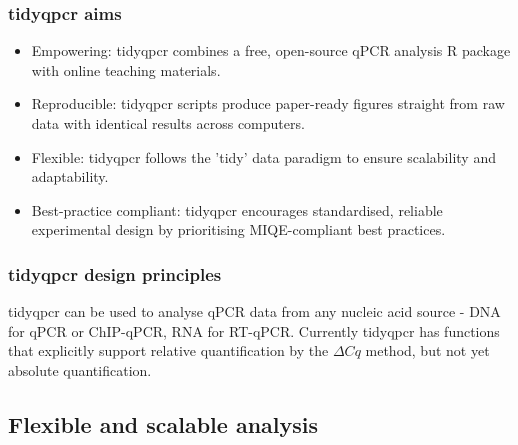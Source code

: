\documentclass{SBCbookchapter}
\begin{document}
\subsubsection{tidyqpcr aims}

\begin{itemize}
    \item Empowering: tidyqpcr combines a free, open-source qPCR analysis R package with online teaching materials.
    \item Reproducible: tidyqpcr scripts produce paper-ready figures straight from raw data with identical results across computers.
    \item Flexible: tidyqpcr follows the 'tidy' data paradigm to ensure scalability and adaptability.
    \item Best-practice compliant: tidyqpcr encourages standardised, reliable experimental design by prioritising MIQE-compliant best practices.
\end{itemize}

\subsubsection{tidyqpcr design principles}

tidyqpcr can be used to analyse qPCR data from any nucleic acid source - DNA for qPCR or ChIP-qPCR, RNA for RT-qPCR. Currently tidyqpcr has functions that explicitly support relative quantification by the $\Delta Cq$ method, but not yet absolute quantification.


\subsection{Flexible and scalable analysis}
\end{document}
